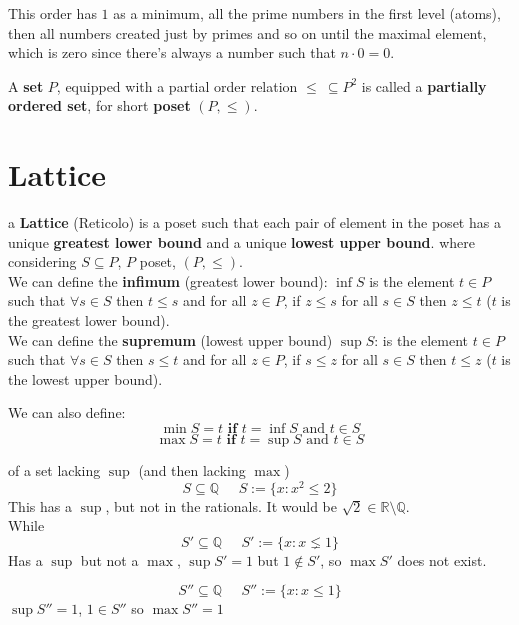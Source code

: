 	This order has $1$ as a minimum, all the prime numbers in the first level (atoms), then all numbers created just by primes and so on until the maximal element, which is zero since there's always a number such that $n \cdot 0 = 0$.

	A \textbf{set} $P$, equipped with a partial order relation $\leq \ \subseteq P^2$ is called a \textbf{partially ordered set}, for short \textbf{poset} $(P, \leq)$.\\

	\section{Lattice}
	a \textbf{Lattice} (Reticolo) is a poset such that each pair of element in the poset has a unique \textbf{greatest lower bound} and a unique \textbf{lowest upper bound}. where considering $S \subseteq P$, $P$ poset, $(P, \leq)$.\\

	\noindent
	We can define the \textbf{infimum} (greatest lower bound): $\inf S$ is the element $t \in P$ such that $\forall s \in S$ then $t \leq s$ and for all $z \in P$, if $z \leq s$ for all $s \in S$ then $z \leq t$ ($t$ is the greatest lower bound). \\

	\noindent
	We can define the \textbf{supremum} (lowest upper bound) $\sup S$: is the element $t \in P$ such that $\forall s \in S$ then $s \leq t$ and for all $z \in P$, if $s \leq z$ for all $s \in S$ then $t \leq z$ ($t$ is the lowest upper bound).

	\noindent
	We can also define:
	$$ \min S = t \textbf{ if } t = \inf S \text{ and } t \in S$$
	$$ \max S = t \textbf{ if } t = \sup S \text{ and } t \in S$$

	\begin{example*}
	of a set lacking $\sup$ (and then lacking $\max$)
	$$ S \subseteq \mathbb{Q} \;\;\;\;\; S := \{x : x^2 \leq 2\}$$
	This has a $\sup$, but not in the rationals. It would be $\sqrt{2} \in \mathbb{R} \setminus \mathbb{Q}$.\\

	\noindent
	While
	$$ S' \subseteq \mathbb{Q} \;\;\;\;\; S' := \{x : x \lneq 1\}$$
	Has a $\sup$ but not a $\max$, $\sup S' = 1$ but $1 \notin S'$, so $\max S'$ does not exist.

	$$ S'' \subseteq \mathbb{Q} \;\;\;\;\; S'' := \{x : x \leq 1\}$$
	$\sup S'' = 1$, $1 \in S''$ so $\max S'' = 1$
	\end{example*}

